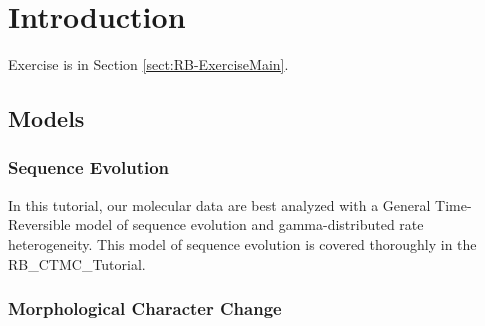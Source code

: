 
\section{Introduction}

\citet{Ronquist2012a} 

Exercise is in Section \ref{sect:RB-ExerciseMain}.

\subsection{Models}

\subsubsection{Sequence Evolution}

In this tutorial, our molecular data are best analyzed with a General Time-Reversible model of sequence evolution and gamma-distributed rate heterogeneity. This model of sequence evolution is covered thoroughly in the RB\_CTMC\_Tutorial.

\subsubsection{Morphological Character Change}

